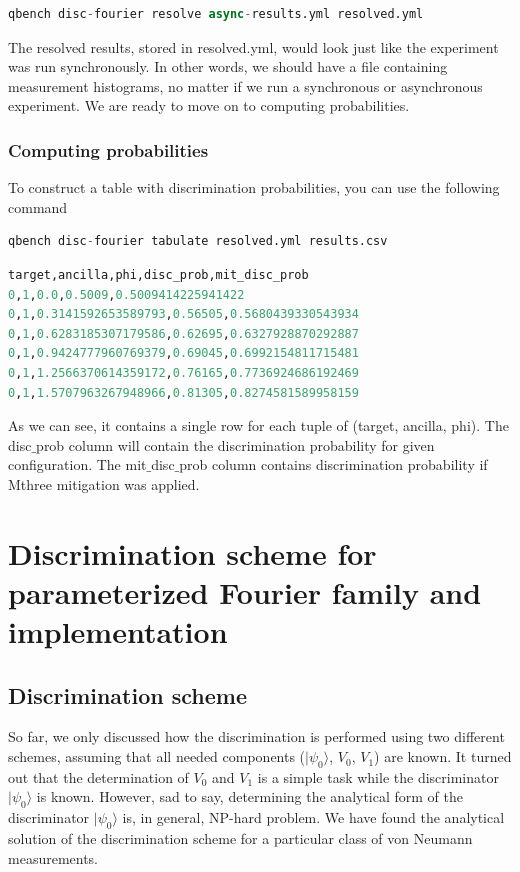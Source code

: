 \documentclass[preprint,12pt, a4paper, dvipsnames]{elsarticle}
\newcommand{\ket}[1]{\ensuremath{|#1\rangle}}
\newcommand{\1}{{\rm 1\hspace{-0.9mm}l}}
\begin{document}
\begin{lstlisting}[language=Python]
qbench disc-fourier resolve async-results.yml resolved.yml
\end{lstlisting}

The resolved results, stored in resolved.yml, would look just like the experiment was run synchronously. In other words, we should have a file containing measurement histograms, no matter if we run a synchronous or asynchronous experiment. We are ready to move on to computing probabilities.


\subsubsection{Computing probabilities}
To construct a table with discrimination probabilities, you can use the following command


\begin{lstlisting}[language=Python]
qbench disc-fourier tabulate resolved.yml results.csv 
\end{lstlisting}


\begin{lstlisting}[language=Python]
target,ancilla,phi,disc_prob,mit_disc_prob
0,1,0.0,0.5009,0.5009414225941422
0,1,0.3141592653589793,0.56505,0.5680439330543934
0,1,0.6283185307179586,0.62695,0.6327928870292887
0,1,0.9424777960769379,0.69045,0.6992154811715481
0,1,1.2566370614359172,0.76165,0.7736924686192469
0,1,1.5707963267948966,0.81305,0.8274581589958159
\end{lstlisting}

As we can see, it contains a single row for each tuple of (target, ancilla, phi). The disc$\_$prob column will contain the discrimination probability for given configuration. The mit$\_$disc$\_$prob column contains discrimination probability if Mthree mitigation was applied.







\section{Discrimination scheme for parameterized Fourier family and implementation}

\subsection{Discrimination scheme}
So far, we only discussed how the discrimination is performed using two different
schemes, assuming that all needed components ($\ket{\psi_0}$, $V_0$, $V_1$) are known. It turned out that the determination of $V_0$ and $V_1$ is a simple task while the discriminator $\ket{\psi_{0}}$ is known. However,
sad to say, determining the analytical form of the discriminator $\ket{\psi_{0}}$
is, in general, NP-hard problem.
We have found the analytical solution of the discrimination scheme for a particular class of von Neumann measurements.
\end{document}
